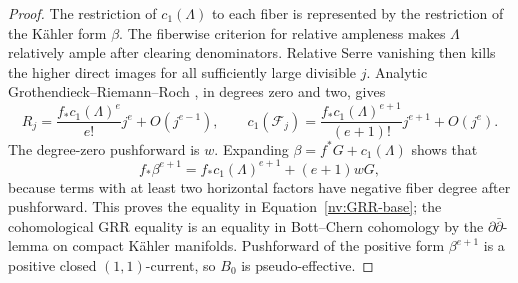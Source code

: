 \begin{proof}
The restriction of \(c_1(\Lambda)\) to each fiber is represented by the
restriction of the Kähler form \(\beta\).  The fiberwise criterion for
relative ampleness makes \(\Lambda\) relatively ample after clearing
denominators.  Relative Serre vanishing then kills the higher direct
images for all sufficiently large divisible \(j\).  Analytic
Grothendieck--Riemann--Roch \cite{LevyGRR}, in degrees zero and two, gives
\[
 R_j=\frac{f_*c_1(\Lambda)^e}{e!}j^e+O(j^{e-1}),\qquad
 c_1(\mathcal F_j)
 =\frac{f_*c_1(\Lambda)^{e+1}}{(e+1)!}j^{e+1}+O(j^e).
\]
The degree-zero pushforward is \(w\).  Expanding
\(\beta=f^*G+c_1(\Lambda)\) shows that
\[
 f_*\beta^{e+1}
 =f_*c_1(\Lambda)^{e+1}+(e+1)wG,
\]
because terms with at least two horizontal factors have negative
fiber degree after pushforward.  This proves the equality in
Equation~\eqref{nv:GRR-base}; the cohomological GRR equality is an equality in
Bott--Chern cohomology by the \(\partial\bar\partial\)-lemma on compact
Kähler manifolds.  Pushforward of the positive form
\(\beta^{e+1}\) is a positive closed \((1,1)\)-current, so \(B_0\) is
pseudo-effective.


\end{proof}
